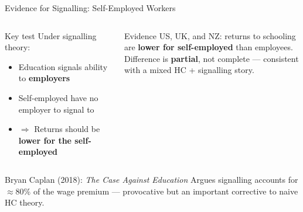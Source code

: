 \documentclass[aspectratio=169, 12pt]{beamer}
\begin{document}
\begin{frame}{Evidence for Signalling: Self-Employed Workers}
  \begin{columns}
      \begin{alertblock}{Key test}
        \small Under signalling theory:
        \begin{itemize}
          \item Education signals ability to \textbf{employers}
          \item Self-employed have no employer to signal to
          \item $\Rightarrow$ Returns should be \textbf{lower for the self-employed}
        \end{itemize}
      \end{alertblock}
      \begin{block}{Evidence}
        \small US, UK, and NZ: returns to schooling are \textbf{lower for self-employed} than
        employees.\\[0.2em]
        Difference is \textbf{partial}, not complete --- consistent with a mixed HC +
        signalling story.
      \end{block}
  \end{columns}
  \vspace{0.1em}
  \begin{exampleblock}{Bryan Caplan (2018): \textit{The Case Against Education}}
    \footnotesize Argues signalling accounts for $\approx$80\% of the wage premium ---
    provocative but an important corrective to naive HC theory.
  \end{exampleblock}
\end{frame}
\end{document}
